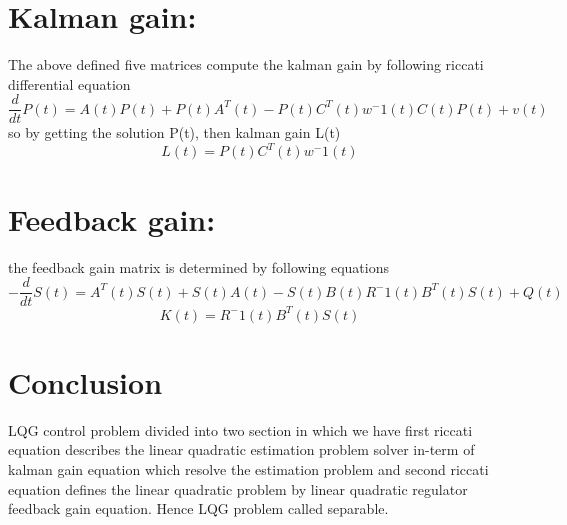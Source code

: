 \documentclass[12pt,a4paper]{article}
\begin{document}
\section{Kalman gain:}
The above defined five matrices compute the kalman gain by following riccati differential equation \cite{van1999optimal} \cite{bernstein1986optimal}
\begin{equation}
\frac{d}{dt}
P(t) = A(t)P(t) + P(t)A^T(t) - P(t)C^T(t)w^-1 (t)C(t)P(t)+v(t)
\end{equation}
so by getting the solution P(t), then kalman gain L(t)
\begin{equation}
L(t) = P(t)C^T(t)w^-1 (t)
\end{equation}
\section{Feedback gain:}
the feedback gain matrix is determined by following equations \cite{van1999optimal} \cite{bernstein1986optimal} \\
\begin{equation}
-\frac{d}{dt}
S(t) = A^T(t)S(t) + S(t)A(t) - S(t)B(t)R^-1 (t)B^T(t)S(t)+Q(t)
\end{equation}
\begin{equation}
K(t) = R^-1(t)B^T(t)S(t)
\end{equation}
\section*{Conclusion}
LQG control problem divided into two section in which we have first  riccati equation describes the linear quadratic estimation problem solver in-term of kalman gain equation which resolve the estimation problem and second riccati equation defines the linear quadratic problem by linear quadratic regulator feedback gain equation. Hence LQG problem called separable.


\end{document}
